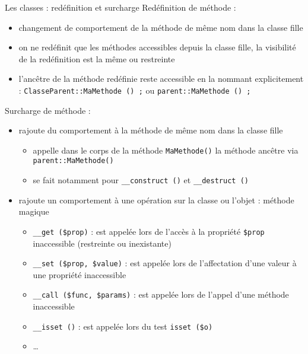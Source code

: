 \begin{frame}[containsverbatim]{Les classes : redéfinition et surcharge}
	Redéfinition de méthode :
	\begin{itemize}
		\item changement de comportement de la méthode de même nom dans la classe fille
		\item on ne redéfinit que les méthodes accessibles depuis la classe fille, la visibilité de la redéfinition est la même ou restreinte
		\item l'ancêtre de la méthode redéfinie reste accessible en la nommant explicitement : \lstinline!ClasseParent::MaMethode () ;! ou \lstinline!parent::MaMethode () ;!
	\end{itemize}
	Surcharge de méthode :
	\begin{itemize}
		\item rajoute du comportement à la méthode de même nom dans la classe fille
		\begin{itemize}
			\item appelle dans le corps de la méthode \lstinline!MaMethode()! la méthode ancêtre via \lstinline!parent::MaMethode()!
			\item se fait notamment pour \lstinline!__construct ()! et \lstinline!__destruct ()!
		\end{itemize}
		\item rajoute un comportement à une opération sur la classe ou l'objet : méthode magique
		\begin{itemize}
			\item \lstinline!__get ($prop)! : est appelée lors de l'accès à la propriété \lstinline!$prop! inaccessible (restreinte ou inexistante)
			\item \lstinline!__set ($prop, $value)! : est appelée lors de l'affectation d'une valeur à une propriété inaccessible
			\item \lstinline!__call ($func, $params)! : est appelée lors de l'appel d'une méthode inaccessible
			\item \lstinline!__isset ()! : est appelée lors du test \lstinline!isset ($o)!
			\item \ldots
		\end{itemize}
	\end{itemize}
\end{frame}

